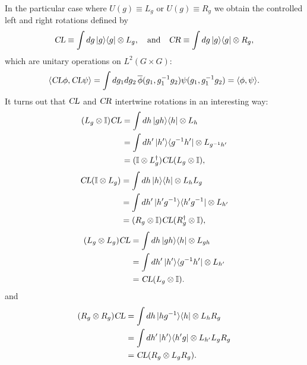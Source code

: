 \documentclass[12pt]{amsart}
\def\CL{\textsl{CL}}
\def\CR{\textsl{CR}}
\theoremstyle{definition}
\theoremstyle{remark}
\numberwithin{equation}{section}
\begin{document}
In the particular case where $U(g) \equiv L_g$ or $U(g) \equiv R_g$ we obtain the controlled left and right rotations defined by
\begin{equation}
	\textsl{CL} \equiv \int dg\, |g\rangle \langle g| \otimes L_g, \quad\text{and}\quad \CR \equiv \int  dg\,|g\rangle \langle g| \otimes R_g,
\end{equation}
which are unitary operations on $L^2(G\times G)$:
\begin{equation}
	\langle \CL\phi, \CL \psi\rangle = \int dg_1dg_2\, \overline{\phi}(g_1,g_1^{-1}g_2) \psi(g_1, g_1^{-1}g_2) = \langle \phi, \psi\rangle.
\end{equation}
It turns out that $\CL$ and $\CR$ intertwine rotations in an interesting way:
\begin{equation}
	\begin{split}
		(L_g \otimes \mathbb{I})  \CL &= \int dh\, |gh\rangle \langle h| \otimes L_{h} \\
		&= \int dh'\, |h'\rangle \langle g^{-1}h'| \otimes L_{g^{-1}h'} \\
		&= (\mathbb{I}\otimes L_g^\dag) \CL  (L_g\otimes \mathbb{I}),\\
	\end{split}
\end{equation}
\begin{equation}
	\begin{split}
		\CL (\mathbb{I} \otimes L_g) &= \int dh\, |h\rangle \langle h| \otimes L_{h}L_g \\
		&= \int dh'\, |h'g^{-1}\rangle \langle h'g^{-1}| \otimes L_{h'} \\
		&= (R_g \otimes \mathbb{I}) \CL  (R_g^\dag\otimes \mathbb{I}),\\
	\end{split}
\end{equation}
\begin{equation}
	\begin{split}
		(L_g \otimes L_g)  \CL &= \int dh\, |gh\rangle \langle h| \otimes L_{gh} \\
		&= \int dh'\, |h'\rangle \langle g^{-1}h'| \otimes L_{h'} \\
		&= \CL  (L_g\otimes \mathbb{I}).\\
	\end{split}
\end{equation}
and
\begin{equation}
	\begin{split}
		(R_g \otimes R_g)  \CL &= \int dh\, |hg^{-1}\rangle \langle h| \otimes L_{h}R_{g} \\
		&= \int dh'\, |h'\rangle \langle h'g| \otimes L_{h'}L_{g}R_{g} \\
		&= \CL  (R_{g}\otimes L_g R_g).\\
	\end{split}
\end{equation}
\end{document}
